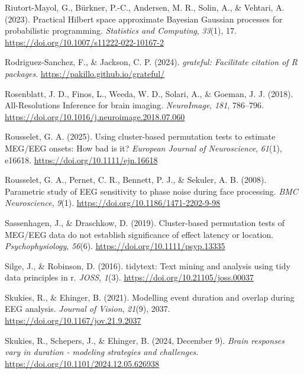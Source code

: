\documentclass[
  doc,
  floatsintext,
  longtable,
  a4paper,
  nolmodern,
  notxfonts,
  notimes,
  donotrepeattitle,
  colorlinks=true,linkcolor=blue,citecolor=blue,urlcolor=blue]{apa7}
\newlength{\cslhangindent}
\newenvironment{CSLReferences}[2] %
 {\begin{list}{}{%
  \setlength{\itemindent}{0pt}
  \setlength{\leftmargin}{0pt}
  \setlength{\parsep}{0pt}
  \ifodd #1
   \setlength{\leftmargin}{\cslhangindent}
   \setlength{\itemindent}{-1\cslhangindent}
  \fi
  \setlength{\itemsep}{#2\baselineskip}}}
 {\end{list}}
\begin{document}
\begin{CSLReferences}{1}{0}
Riutort-Mayol, G., Bürkner, P.-C., Andersen, M. R., Solin, A., \&
Vehtari, A. (2023). Practical {Hilbert} space approximate {Bayesian
Gaussian} processes for probabilistic programming. \emph{Statistics and
Computing}, \emph{33}(1), 17.
\url{https://doi.org/10.1007/s11222-022-10167-2}

Rodriguez-Sanchez, F., \& Jackson, C. P. (2024). \emph{{grateful}:
Facilitate citation of {R} packages}.
\url{https://pakillo.github.io/grateful/}

Rosenblatt, J. D., Finos, L., Weeda, W. D., Solari, A., \& Goeman, J. J.
(2018). All-Resolutions Inference for brain imaging. \emph{NeuroImage},
\emph{181}, 786--796.
\url{https://doi.org/10.1016/j.neuroimage.2018.07.060}

Rousselet, G. A. (2025). Using cluster-based permutation tests to
estimate {MEG}/{EEG} onsets: {How} bad is it? \emph{European Journal of
Neuroscience}, \emph{61}(1), e16618.
\url{https://doi.org/10.1111/ejn.16618}

Rousselet, G. A., Pernet, C. R., Bennett, P. J., \& Sekuler, A. B.
(2008). Parametric study of EEG sensitivity to phase noise during face
processing. \emph{BMC Neuroscience}, \emph{9}(1).
\url{https://doi.org/10.1186/1471-2202-9-98}

Sassenhagen, J., \& Draschkow, D. (2019). Cluster{-}based permutation
tests of MEG/EEG data do not establish significance of effect latency or
location. \emph{Psychophysiology}, \emph{56}(6).
\url{https://doi.org/10.1111/psyp.13335}

Silge, J., \& Robinson, D. (2016). {tidytext}: Text mining and analysis
using tidy data principles in r. \emph{JOSS}, \emph{1}(3).
\url{https://doi.org/10.21105/joss.00037}

Skukies, R., \& Ehinger, B. (2021). Modelling event duration and overlap
during {EEG} analysis. \emph{Journal of Vision}, \emph{21}(9), 2037.
\url{https://doi.org/10.1167/jov.21.9.2037}

Skukies, R., Schepers, J., \& Ehinger, B. (2024, December 9).
\emph{Brain responses vary in duration - modeling strategies and
challenges}. \url{https://doi.org/10.1101/2024.12.05.626938}


\end{CSLReferences}
\end{document}
